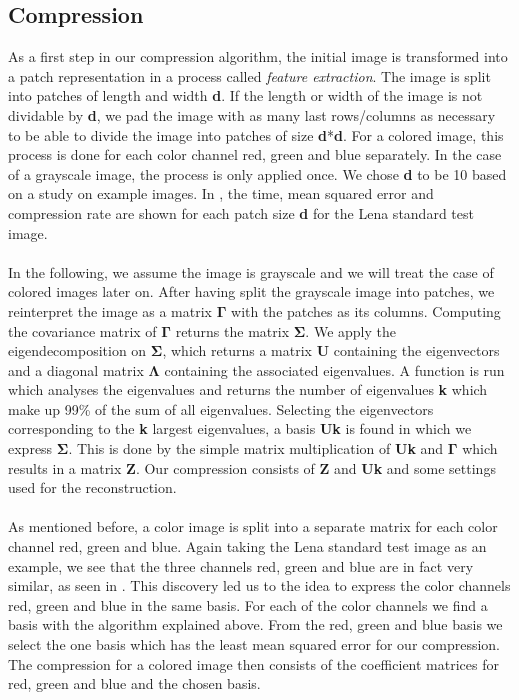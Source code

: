 \documentclass[10pt,conference,compsocconf]{IEEEtran}
\begin{document}
\subsection{Compression}
As a first step in our compression algorithm, the initial image is transformed into a patch representation in a process called \textit{feature extraction}. The image is split into patches of length and  width \textbf{d}. If the length or width of the image is not dividable by \textbf{d}, we pad the image with as many last rows/columns as necessary to be able to divide the image into patches of size \textbf{d}*\textbf{d}. For a colored image, this process is done for each color channel red, green and blue separately. In the case of a grayscale image, the process is only applied once. We chose \textbf{d} to be 10 based on a study on example images. In , the time, mean squared error and compression rate are shown for each patch size \textbf{d} for the Lena standard test image.
\\
\\
In the following, we assume the image is grayscale and we will treat the case of colored images later on. After having split the grayscale image into patches, we reinterpret the image as a matrix $\boldsymbol{\Gamma}$ with the patches as its columns. Computing the covariance matrix of $\boldsymbol{\Gamma}$ returns the matrix  $\boldsymbol{\Sigma}$. We apply the eigendecomposition on $\boldsymbol{\Sigma}$, which returns a matrix \textbf{U} containing the eigenvectors and a diagonal matrix $\boldsymbol{\Lambda}$ containing the associated eigenvalues. A function is run which analyses the eigenvalues and returns the number of eigenvalues \textbf{k} which make up 99\% of the sum of all eigenvalues. Selecting the eigenvectors corresponding to the \textbf{k} largest eigenvalues, a basis \textbf{Uk} is found in which we express $\boldsymbol{\Sigma}$. This is done by the simple matrix multiplication of \textbf{Uk} and $\boldsymbol{\Gamma}$ which results in a matrix \textbf{Z}. Our compression consists of \textbf{Z} and \textbf{Uk} and some settings used for the reconstruction.
\\
\\
As mentioned before, a color image is split into a separate matrix for each color channel red, green and blue. Again taking the Lena standard test image as an example, we see that the three channels red, green and blue are in fact very similar, as seen in . This discovery led us to the idea to express the color channels red, green and blue in the same basis. For each of the color channels we find a basis with the algorithm explained above. From the red, green and blue basis we select the one basis which has the least mean squared error for our compression. The compression for a colored image then consists of the coefficient matrices for red, green and blue and the chosen basis.
\end{document}
